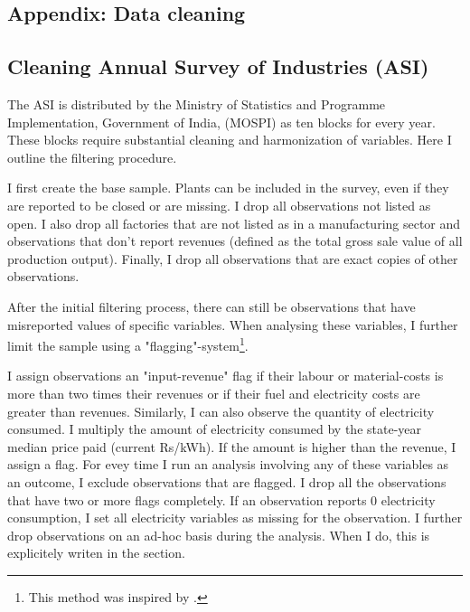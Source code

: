 \documentclass[11pt]{article}
\begin{document}

\newpage



\begin{appendices}

\newpage

\section{Appendix: Data cleaning}%
\label{sec:appendix_data_cleaning}

\subsection{Cleaning Annual Survey of Industries (ASI)}%
\label{sub:cleaning_annual_survey_of_industries_asi}

The ASI is distributed by the Ministry of Statistics and Programme Implementation, Government of India, (MOSPI) as ten blocks for every year. These blocks require substantial cleaning and harmonization of variables. Here I outline the filtering procedure.

I first create the base sample. Plants can be included in the survey, even if they are reported to be closed or are missing. I drop all observations not listed as open. I also drop all factories that are not listed as in a manufacturing sector and observations that don't report revenues (defined as the total gross sale value of all production output). Finally, I drop all observations that are exact copies of other observations.

After the initial filtering process, there can still be observations that have misreported values of specific variables. When analysing these variables, I further limit the sample using a "flagging"-system\footnote{This method was inspired by \cite{allcott_how_2016}.}. 

I assign observations an "input-revenue" flag if their labour or material-costs is more than two times their revenues or if their fuel and electricity costs are greater than revenues. Similarly, I can also observe the quantity of electricity consumed. I multiply the amount of electricity consumed by the state-year median price paid (current Rs/kWh). If the amount is higher than the revenue, I assign a flag. For evey time I run an analysis involving any of these variables as an outcome, I exclude observations that are flagged. I drop all the observations that have two or more flags completely. If an observation reports 0 electricity consumption, I set all electricity variables as missing for the observation. I further drop observations on an ad-hoc basis during the analysis. When I do, this is explicitely writen in the section.


\end{appendices}
\end{document}
